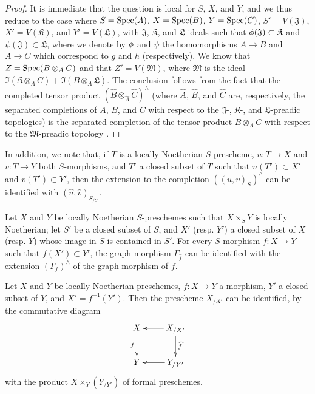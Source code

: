 \begin{proof}
It is immediate that the question is local for $S$, $X$, and $Y$, and we thus reduce to the case where $S=\operatorname{Spec}(A)$, $X=\operatorname{Spec}(B)$, $Y=\operatorname{Spec}(C)$, $S'=V(\mathfrak{J})$, $X'=V(\mathfrak{K})$, and $Y'=V(\mathfrak{L})$, with $\mathfrak{J}$, $\mathfrak{K}$, and $\mathfrak{L}$ ideals such that $\phi(\mathfrak{J})\subset\mathfrak{K}$ and $\psi(\mathfrak{J})\subset\mathfrak{L}$, where we denote by $\phi$ and $\psi$ the homomorphisms $A\to B$ and $A\to C$ which correspond to $g$ and $h$ (respectively).
We know that $Z=\operatorname{Spec}(B\otimes_A C)$ and that $Z'=V(\mathfrak{M})$, where $\mathfrak{M}$ is the ideal $\Im(\mathfrak{K}\otimes_A C)+\Im(B\otimes_A\mathfrak{L})$.
The conclusion follows  from the fact that the completed tensor product $(\widehat{B}\otimes_{\widehat{A}}\widehat{C})^\wedge$ (where $\widehat{A}$, $\widehat{B}$, and $\widehat{C}$ are, respectively, the separated completions of $A$, $B$, and $C$ with respect to the $\mathfrak{J}$-, $\mathfrak{K}$-, and $\mathfrak{L}$-preadic topologies) is the separated completion of the tensor product $B\otimes_A C$ with respect to the $\mathfrak{M}$-preadic topology .
\end{proof}

In addition, we note that, if $T$ is a locally Noetherian $S$-prescheme, $u:T\to X$ and $v:T\to Y$ both $S$-morphisms, and $T'$ a closed subset of $T$ such that $u(T')\subset X'$ and $v(T')\subset Y'$, then the extension to the completion $((u,v)_S)^\wedge$ can be identified with $(\widehat{u},\widehat{v})_{S_{/S'}}$.

\begin{corollary}[10.9.8]
\label{I.10.9.8}
Let $X$ and $Y$ be locally Noetherian $S$-preschemes such that $X\times_S Y$ is locally Noetherian; let $S'$ be a closed subset of $S$, and $X'$ (resp. $Y'$) a closed subset of $X$ (resp. $Y$) whose image in $S$ is contained in $S'$.
For every $S$-morphism $f:X\to Y$ such that $f(X')\subset Y'$, the graph morphism $\Gamma_{\widehat{f}}$ can be identified with the extension $(\Gamma_f)^\wedge$ of the graph morphism of $f$.
\end{corollary}

\begin{corollary}[10.9.9]
\label{I.10.9.9}
Let $X$ and $Y$ be locally Noetherian preschemes, $f:X\to Y$ a morphism, $Y'$ a closed subset of $Y$, and $X'=f^{-1}(Y')$.
Then the prescheme $X_{/X'}$ can be identified, by the commutative diagram
\[
  \xymatrix{
    X\ar[d]_f &
    X_{/X'}\ar[l]\ar[d]^{\widehat{f}}\\
    Y &
    Y_{/Y'}\ar[l]
  }
\]
with the product $X\times_Y(Y_{/Y'})$ of formal preschemes.
\end{corollary}

